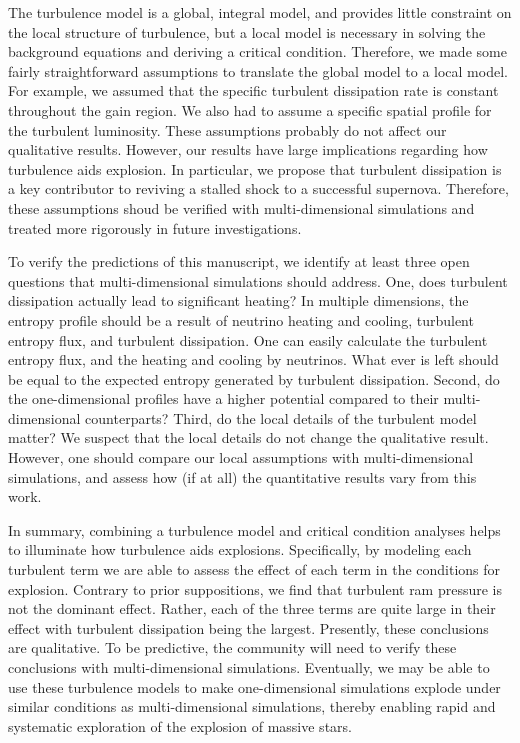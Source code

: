 \documentclass[twocolumn]{aastex6}
\begin{document}
The turbulence model is a global, integral model, and provides
  little constraint on the local structure of turbulence, but
    a local model is necessary in solving the background
    equations and deriving a critical condition.  Therefore,  
we made some fairly straightforward assumptions to translate the
  global model to a local model. For example, we
    assumed that the specific turbulent dissipation rate is
      constant throughout the gain region. We also had to assume a
      specific spatial profile for the turbulent luminosity.  These assumptions probably do
    not affect our qualitative results.  However, our results have large implications regarding how turbulence  aids explosion.  In particular, we propose that turbulent
  dissipation is a key contributor to reviving a stalled shock to a
  successful supernova.  Therefore, these assumptions
    shoud be verified with multi-dimensional simulations and treated more rigorously in future
    investigations.

To verify the predictions of this manuscript, we identify at least three open
  questions that multi-dimensional simulations should address.  One, does turbulent
  dissipation actually lead to significant heating?
In multiple dimensions, the entropy profile should be a result of neutrino heating and cooling, turbulent entropy flux, and turbulent
    dissipation.  One can easily calculate the turbulent entropy flux,
    and the heating and cooling by neutrinos.  What ever is left
    should be equal to the expected entropy generated by turbulent
    dissipation. Second, do the one-dimensional profiles
      have a higher potential compared to their multi-dimensional
      counterparts? Third, do the local
      details of the turbulent model matter?  We suspect that the
    local details do not change the
    qualitative result. However, one should compare our local assumptions with multi-dimensional
      simulations, and assess how (if at all) the
    quantitative results vary from this work.

In summary, combining a turbulence model and critical
  condition analyses helps to illuminate how turbulence aids
  explosions.  Specifically, by modeling each turbulent term we are
  able to assess the effect of each term in the conditions for
  explosion.  Contrary to prior suppositions, we find that turbulent
  ram pressure is not the dominant effect.  Rather, each of the three
  terms are quite large in their effect with turbulent dissipation
  being the largest.  Presently, these conclusions are qualitative.
  To be predictive, the community will need to verify these
  conclusions with multi-dimensional simulations.  Eventually, we may
  be able to use these turbulence models to make one-dimensional
  simulations explode under similar conditions as multi-dimensional
  simulations, thereby enabling rapid and systematic exploration of
  the explosion of massive stars.
\end{document}
